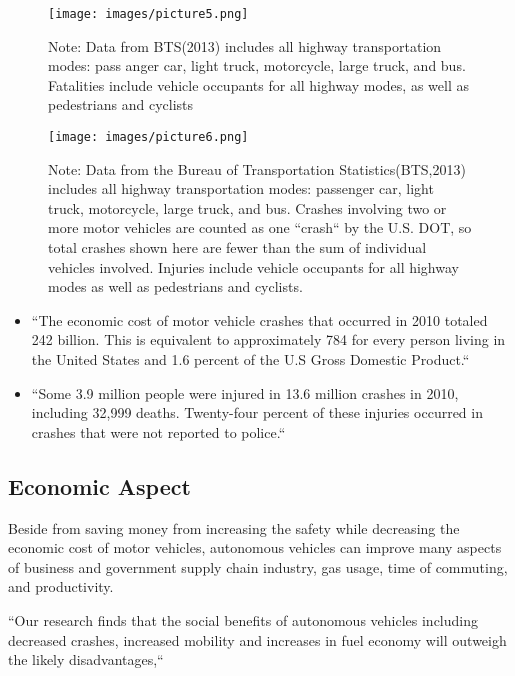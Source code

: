 \documentclass{acmart}
\begin{document}
 \begin{figure}[!ht]
  \centering
      \texttt{[image: images/picture5.png]}
  \caption{Note: Data from BTS(2013) includes all highway transportation modes: pass anger car, light truck, motorcycle, large truck, and bus. Fatalities include vehicle occupants for all highway modes, as well as pedestrians and cyclists}\label{fig:NHTSAaccidentreport}
\end{figure}

 \begin{figure}[!ht]
  \centering
      \texttt{[image: images/picture6.png]}
  \caption{Note: Data from the Bureau of Transportation Statistics(BTS,2013) includes all highway transportation modes: passenger car, light truck, motorcycle, large truck, and bus. Crashes involving two or more motor vehicles are counted as one ``crash`` by the U.S. DOT, so total crashes shown  here are fewer than the sum of individual vehicles involved. Injuries include vehicle occupants for all highway modes as well as pedestrians and cyclists.}\label{fig:NHTSAaccidentreport2}
\end{figure}

\begin{itemize}

\item ``The economic cost of motor vehicle crashes that occurred in 2010 totaled 242 billion. This is equivalent to approximately 784 for every person living in the United States and 1.6 percent of the U.S Gross Domestic Product.``\cite{lawrance}

\item ``Some 3.9 million people were injured in 13.6 million crashes in 2010, including 32,999 deaths. Twenty-four percent of these injuries occurred in crashes that were not reported to police.``\cite{lawrance}

\end{itemize}


\subsection{Economic Aspect}
Beside from saving money from increasing the safety while decreasing the economic cost of motor vehicles, autonomous vehicles can improve many aspects of business and government supply chain industry, gas usage, time of commuting, and productivity.
\begin{center}
``Our research finds that the social benefits of autonomous vehicles including decreased crashes, increased mobility and increases in fuel economy will outweigh the likely disadvantages,``\cite{RAND}
\end{center}
\end{document}
